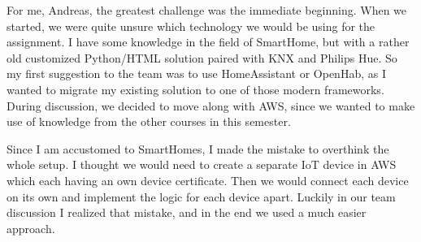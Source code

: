 For me, Andreas, the greatest challenge was the immediate beginning.
When we started, we were quite unsure which technology we would be using for the assignment.
I have some knowledge in the field of SmartHome, but with a rather old customized Python/HTML solution paired with KNX and Philips Hue.
So my first suggestion to the team was to use HomeAssistant or OpenHab, as I wanted to migrate my existing solution to one of those modern frameworks.
During discussion, we decided to move along with AWS, since we wanted to make use of knowledge from the other courses in this semester.

Since I am accustomed to SmartHomes, I made the mistake to overthink the whole setup.
I thought we would need to create a separate IoT device in AWS which each having an own device certificate.
Then we would connect each device on its own and implement the logic for each device apart.
Luckily in our team discussion I realized that mistake, and in the end we used a much easier approach.
